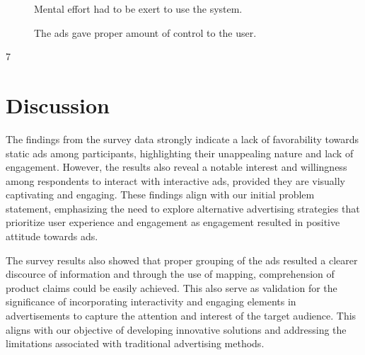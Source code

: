 \documentclass[journal]{IEEEtran}
\begin{document}
\begin{figure}[ht]
    \centering
    \caption{Mental effort had to be exert to use the system. }
\end{figure}

\begin{figure}[ht]
    \centering
    \caption{The ads gave proper amount of control to the user. }
\end{figure}
7

\section{Discussion}
The findings from the survey data strongly indicate a lack of favorability towards
static ads among participants, highlighting their unappealing nature and lack of
engagement. However, the results also reveal a notable interest and willingness
among respondents to interact with interactive ads, provided they are visually
captivating and engaging. These findings align with our initial problem statement,
emphasizing the need to explore alternative advertising strategies that prioritize
user experience and engagement as engagement resulted in positive attitude towards ads.

The survey results also showed that proper grouping of the ads resulted a clearer discource of
information and through the use of mapping, comprehension of product claims could be easily achieved.
This also serve as validation for the significance of incorporating interactivity and engaging elements in advertisements to capture the attention
and interest of the target audience. This aligns with our objective of developing innovative solutions
and addressing the limitations associated with traditional advertising methods.
\end{document}
